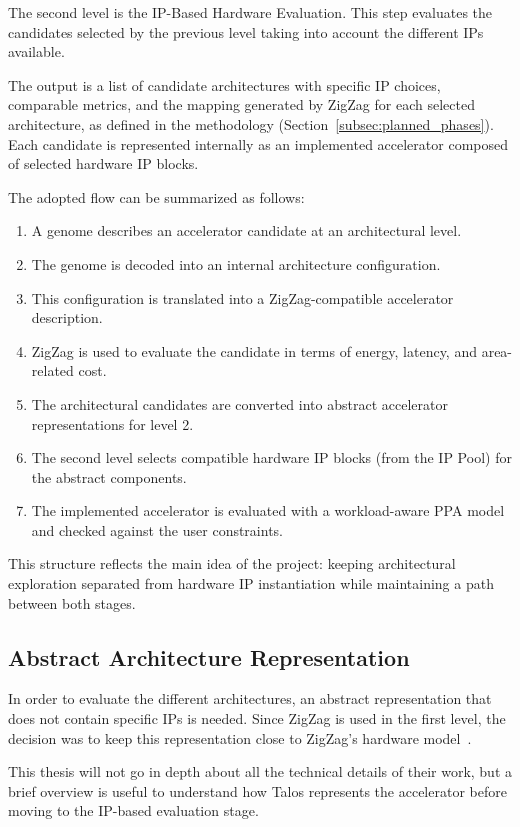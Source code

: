 The second level is the IP-Based Hardware Evaluation. This step
evaluates the candidates selected by the previous level taking into
account the different IPs available.

The output is a list of candidate architectures with specific
IP choices, comparable metrics, and the mapping generated by ZigZag
for each selected architecture, as defined in the methodology
(Section~\ref{subsec:planned_phases}). Each candidate is represented
internally as an implemented accelerator composed of selected
hardware IP blocks.

The adopted flow can be summarized as follows:

\begin{enumerate}
\item A genome describes an accelerator candidate at an architectural
level.
\item The genome is decoded into an internal architecture
configuration.
\item This configuration is translated into a ZigZag-compatible
accelerator description.
\item ZigZag is used to evaluate the candidate in terms of energy,
latency, and area-related cost.
\item The architectural candidates are converted into abstract
accelerator representations for level 2.
\item The second level selects compatible hardware IP blocks (from the IP Pool) for the
abstract components.
\item The implemented accelerator is evaluated with a workload-aware
PPA model and checked against the user constraints.
\end{enumerate}

This structure reflects the main idea of the project: keeping
architectural exploration separated from hardware IP instantiation
while maintaining a path between both stages.

\subsection{Abstract Architecture Representation}
\label{subsec:abstract_representation}
In order to evaluate the different architectures, an abstract
representation that does not contain specific IPs is needed. Since
ZigZag is used in the first level, the decision was to keep this
representation close to ZigZag's hardware
model~\cite{zigzag_hardware_docs}.

This thesis will not go in depth about all the technical details of
their work, but a brief overview is useful to understand how Talos
represents the accelerator before moving to the IP-based evaluation
stage.

